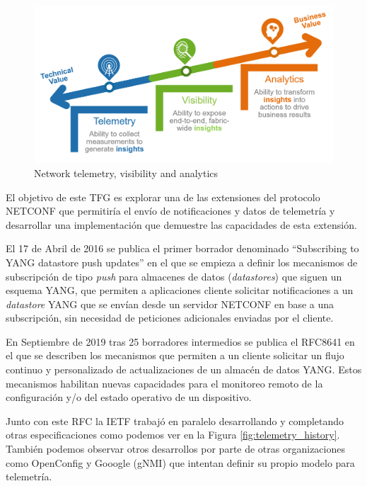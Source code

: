     \begin{figure}[H]
        \centering
        \includegraphics[scale=0.18]{graphics/Telemetry-Visibility-Analytics.png}
        \caption{Network telemetry, visibility and analytics}
        \label{fig:Telemetry_bussinesss}
    \end{figure}
    
    El objetivo de este \gls{TFG} es explorar una de las extensiones del protocolo NETCONF que permitiría el envío de notificaciones y datos de telemetría y desarrollar una implementación que demuestre las capacidades de esta extensión.
    
    El 17 de Abril de 2016 se publica el primer borrador denominado  \enquote{Subscribing to YANG datastore push updates} en el que se empieza a definir los mecanismos de subscripción de tipo \textit{push} para almacenes de datos (\textit{datastores}) que siguen un esquema YANG, que permiten a aplicaciones cliente solicitar notificaciones a un \textit{datastore} YANG que se envían desde un servidor NETCONF en base a una subscripción, sin necesidad de peticiones adicionales enviadas por el cliente\cite{draft-ietf-netconf-yang-push-00}.

    En Septiembre de 2019 tras 25 borradores intermedios se publica el \gls{RFC}8641 en el que se describen los mecanismos que permiten a un cliente solicitar un flujo continuo y personalizado de actualizaciones de un almacén de datos YANG. Estos mecanismos habilitan nuevas capacidades para el monitoreo remoto de la configuración y/o del estado operativo de un dispositivo\cite{RFC8641}.
    
    Junto con este \gls{RFC} la \gls{IETF} trabajó en paralelo desarrollando y completando otras especificaciones como podemos ver en la Figura \ref{fig:telemetry_history}. También podemos observar otros desarrollos por parte de otras organizaciones como OpenConfig y Gooogle (gNMI) que intentan definir su propio modelo para telemetría.
    
